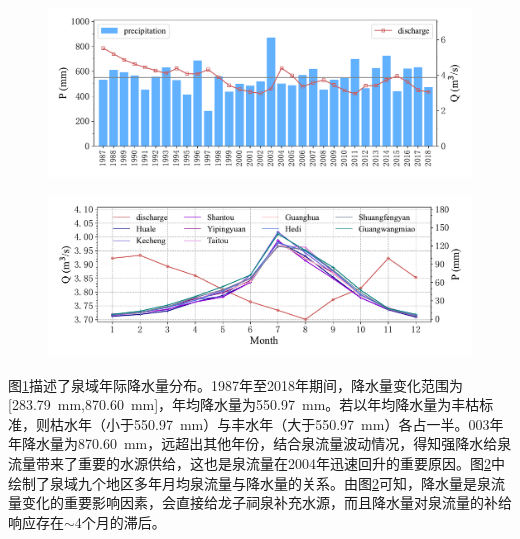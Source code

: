 \begin{figure}[!htbp]
  \centering
  \includegraphics[width=\textwidth]{Img/chap4_spr/spr_total_precipitation_yearly}
  \vspace{-1cm}
  \label{fig:spr_total_precipitation_yearly}
\end{figure}

\begin{figure}[!htbp]
  \centering
  \includegraphics[width=\textwidth]{Img/chap4_spr/spr_discharge_month}
  \vspace{-1cm}
  \label{fig:spr_discharge_month}
\end{figure}

图\ref{fig:spr_total_precipitation_yearly}描述了泉域年际降水量分布。1987年至2018年期间，降水量变化范围为[\SI{283.79}{mm},\SI{870.60}{mm}]，年均降水量为\SI{550.97}{mm}。若以年均降水量为丰枯标准，则枯水年（小于\SI{550.97}{mm}）与丰水年（大于\SI{550.97}{mm}）各占一半。003年年降水量为\SI{870.60}{mm}，远超出其他年份，结合泉流量波动情况，得知强降水给泉流量带来了重要的水源供给，这也是泉流量在2004年迅速回升的重要原因。图\ref{fig:spr_discharge_month}中绘制了泉域九个地区多年月均泉流量与降水量的关系。由图\ref{fig:spr_discharge_month}可知，降水量是泉流量变化的重要影响因素，会直接给龙子祠泉补充水源，而且降水量对泉流量的补给响应存在$\sim$4个月的滞后。

